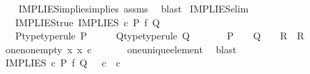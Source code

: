 \begin{isabellebody}
%
\isadelimproof
\ \ %
\endisadelimproof
%
\isatagproof
{}\isamarkupfalse%
\ IMPLIES{\isacharunderscore}{\kern0pt}implies{\isacharunderscore}{\kern0pt}implies\ assms\ \isamarkupfalse%
\ blast%
\endisatagproof
{\isafoldproof}%
%
\isadelimproof
\isanewline
%
\endisadelimproof
\isanewline
{}\isamarkupfalse%
\ IMPLIES{\isacharunderscore}{\kern0pt}elim{\isacharprime}{\kern0pt}{\isacharprime}{\kern0pt}{\isacharcolon}{\kern0pt}\isanewline
\ \ \ IMPLIES{\isacharunderscore}{\kern0pt}true{\isacharcolon}{\kern0pt}\ {\isachardoublequoteopen}IMPLIES\ {\isasymcirc}\isactrlsub c\ {\isacharparenleft}{\kern0pt}P\ {\isasymtimes}\isactrlsub f\ Q{\isacharparenright}{\kern0pt}\ {\isacharequal}{\kern0pt}\ {\isasymt}{\isachardoublequoteclose}\isanewline
\ \ \ P{\isacharunderscore}{\kern0pt}type{\isacharbrackleft}{\kern0pt}type{\isacharunderscore}{\kern0pt}rule{\isacharbrackright}{\kern0pt}{\isacharcolon}{\kern0pt}\ {\isachardoublequoteopen}P\ {\isacharcolon}{\kern0pt}\ {\isasymone}\ {\isasymrightarrow}\ {\isasymOmega}{\isachardoublequoteclose}\ \ Q{\isacharunderscore}{\kern0pt}type{\isacharbrackleft}{\kern0pt}type{\isacharunderscore}{\kern0pt}rule{\isacharbrackright}{\kern0pt}{\isacharcolon}{\kern0pt}\ {\isachardoublequoteopen}Q\ {\isacharcolon}{\kern0pt}\ {\isasymone}\ {\isasymrightarrow}\ {\isasymOmega}{\isachardoublequoteclose}\isanewline
\ \ \ {\isachardoublequoteopen}{\isacharparenleft}{\kern0pt}P\ {\isacharequal}{\kern0pt}\ {\isasymt}{\isacharparenright}{\kern0pt}\ {\isasymLongrightarrow}\ {\isacharparenleft}{\kern0pt}{\isacharparenleft}{\kern0pt}Q\ {\isacharequal}{\kern0pt}\ {\isasymt}{\isacharparenright}{\kern0pt}\ {\isasymLongrightarrow}\ R{\isacharparenright}{\kern0pt}\ {\isasymLongrightarrow}\ R{\isachardoublequoteclose}\isanewline
%
\isadelimproof
%
\endisadelimproof
%
\isatagproof
{}\isamarkupfalse%
\ {\isacharminus}{\kern0pt}\isanewline
\ \ \isamarkupfalse%
\ one{\isacharunderscore}{\kern0pt}nonempty{\isacharcolon}{\kern0pt}\ {\isachardoublequoteopen}{\isasymexists}x{\isachardot}{\kern0pt}\ x\ {\isasymin}\isactrlsub c\ {\isasymone}{\isachardoublequoteclose}\isanewline
\ \ \ \ \isamarkupfalse%
\ one{\isacharunderscore}{\kern0pt}unique{\isacharunderscore}{\kern0pt}element\ \isamarkupfalse%
\ blast\isanewline
\ \ \isamarkupfalse%
\ {\isachardoublequoteopen}{\isacharparenleft}{\kern0pt}IMPLIES\ {\isasymcirc}\isactrlsub c\ {\isacharparenleft}{\kern0pt}P\ {\isasymtimes}\isactrlsub f\ Q{\isacharparenright}{\kern0pt}\ {\isacharequal}{\kern0pt}\ {\isasymt}\ {\isasymcirc}\isactrlsub c\ {\isasymbeta}\isactrlbsub {\isasymone}\ {\isasymtimes}\isactrlsub c\ {\isasymone}\isactrlesub {\isacharparenright}{\kern0pt}{\isachardoublequoteclose}\isanewline

\end{isabellebody}

